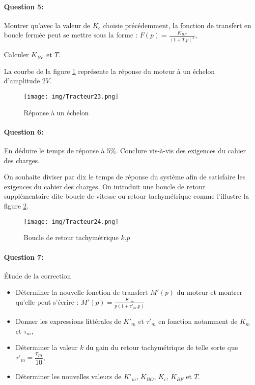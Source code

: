 \paragraph{Question 5:} Montrer qu'avec la valeur de $K_c$ choisie précédemment, la fonction de transfert en boucle fermée peut se mettre sous la forme : $F(p)=\frac{K_{BF}}{(1+T.p)^2}$,

Calculer $K_{BF}$ et $T$.

La courbe de la figure \ref{fig23} représente la réponse du moteur à un échelon d'amplitude $2V$.

\begin{figure}[!h]
\centering\texttt{[image: img/Tracteur23.png]}
\caption{Réponse à un échelon}
\label{fig23}
\end{figure}

\paragraph{Question 6:} En déduire le temps de réponse à 5\%. Conclure vis-à-vis des exigences du
cahier des charges.

On souhaite diviser par dix le temps de réponse du système afin de satisfaire les exigences du cahier des charges. On introduit une boucle de retour supplémentaire dite boucle de vitesse ou retour tachymétrique comme l'illustre la figure \ref{fig24}.

\begin{figure}[!h]
\centering\texttt{[image: img/Tracteur24.png]}
\caption{Boucle de retour tachymétrique $k.p$}
\label{fig24}
\end{figure}

\paragraph{Question 7:} Étude de la correction

\begin{itemize}
 \item Déterminer la nouvelle fonction de transfert $M'(p)$ du moteur et montrer qu'elle peut s'écrire : $M'(p)=\frac{K'_m}{p(1+\tau'_m.p)}$

 \item Donner les expressions littérales de $K'_m$ et $\tau'_m$ en fonction notamment de $K_m$ et $\tau_m$,
 \item Déterminer la valeur $k$ du gain du retour tachymétrique de telle sorte que $\tau'_m=\dfrac{\tau_m}{10}$,
 \item Déterminer les nouvelles valeurs de $K'_m$, $K_{BO}$, $K_c$, $K_{BF}$ et $T$.
\end{itemize}

